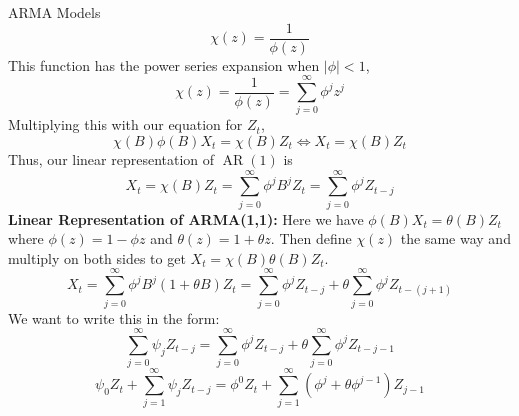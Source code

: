 \documentclass{article}
\DeclareMathOperator{\ar}{AR}
\begin{document}
\begin{multicols*}{3}
\begin{blackbox}{ARMA Models}
    \[\chi(z) = \frac{1}{\phi(z)}\]
    This function has the power series expansion when $|\phi| < 1$, \\[-4ex]
    \[\chi(z) = \frac{1}{\phi(z)} = \sum_{j=0}^\infty \phi^jz^j\]
    Multiplying this with our equation for $Z_t$, \\[-1ex]
    \[\chi(B)\phi(B)X_t = \chi(B)Z_t \iff X_t = \chi(B)Z_t\]
    Thus, our linear representation of $\ar(1)$ is \\[-3ex]
    \[X_t = \chi(B)Z_t = \sum_{j=0}^\infty \phi^jB^jZ_t = \sum_{j=0}^\infty \phi^jZ_{t-j}\]
    \textbf{Linear Representation of ARMA(1,1):} Here we have $\phi(B)X_t = \theta(B)Z_t$
    where $\phi(z) = 1 - \phi z$ and $\theta(z) = 1 + \theta z$. Then define $\chi(z)$ the same way and multiply on both sides to get $X_t = \chi(B)\theta(B)Z_t$.\\[-4ex]
    \[X_t = \sum_{j=0}^\infty \phi^jB^j(1+\theta B)Z_t = \sum_{j=0}^\infty \phi^jZ_{t-j} + \theta\sum_{j=0}^\infty \phi^jZ_{t-(j+1)}\]
    We want to write this in the form:\\[-3ex]
    \[\sum_{j=0}^\infty \psi_jZ_{t-j} = \sum_{j=0}^\infty \phi^jZ_{t-j} + \theta\sum_{j=0}^\infty\phi^j Z_{t-j-1}\]
    \[\psi_0Z_t + \sum_{j=1}^\infty \psi_jZ_{t-j} = \phi^0Z_t + \sum_{j=1}^\infty (\phi^j + \theta \phi^{j-1})Z_{j-1}\]
    \vspace{-2ex}


\end{blackbox}
\end{multicols*}
\end{document}
